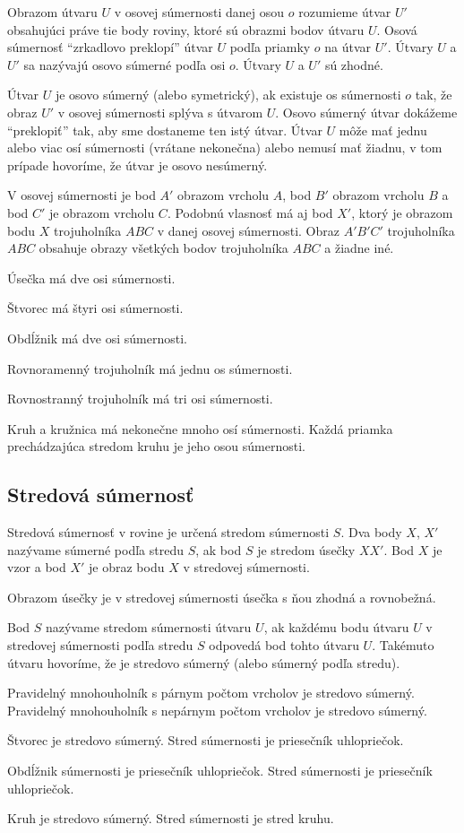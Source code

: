 \documentclass{article}
\begin{document}
Obrazom útvaru \(U\) v osovej súmernosti danej osou \(o\) rozumieme útvar \(U'\) obsahujúci práve tie body roviny, ktoré sú obrazmi bodov útvaru \(U\). Osová súmernosť \enquote{zrkadlovo preklopí} útvar \(U\) podľa priamky \(o\) na útvar \(U'\). Útvary \(U\) a \(U'\) sa nazývajú osovo súmerné podľa osi \(o\). Útvary \(U\) a \(U'\) sú zhodné.

Útvar \(U\) je osovo súmerný (alebo symetrický), ak existuje os súmernosti \(o\) tak, že obraz \(U'\) v osovej súmernosti splýva s útvarom \(U\). Osovo súmerný útvar dokážeme \enquote{preklopiť} tak, aby sme dostaneme ten istý útvar. Útvar \(U\) môže mať jednu alebo viac osí súmernosti (vrátane nekonečna) alebo nemusí mať žiadnu, v tom prípade hovoríme, že útvar je osovo nesúmerný.

V osovej súmernosti je bod \(A'\) obrazom vrcholu \(A\), bod \(B'\) obrazom vrcholu \(B\) a bod \(C'\) je obrazom vrcholu \(C\). Podobnú vlasnosť má aj bod \(X'\), ktorý je obrazom bodu \(X\) trojuholníka \(ABC\) v danej osovej súmernosti. Obraz \(A'B'C'\) trojuholníka \(ABC\) obsahuje obrazy všetkých bodov trojuholníka \(ABC\) a žiadne iné.

Úsečka má dve osi súmernosti.

Štvorec má štyri osi súmernosti.

Obdĺžnik má dve osi súmernosti.

Rovnoramenný trojuholník má jednu os súmernosti.

Rovnostranný trojuholník má tri osi súmernosti.

Kruh a kružnica má nekonečne mnoho osí súmernosti. Každá priamka prechádzajúca stredom kruhu je jeho osou súmernosti.

\subsection{Stredová súmernosť}

Stredová súmernosť v rovine je určená stredom súmernosti \(S\). Dva body \(X\), \(X'\) nazývame súmerné podľa stredu \(S\), ak bod \(S\) je stredom úsečky \(XX'\). Bod \(X\) je vzor a bod \(X'\) je obraz bodu \(X\) v stredovej súmernosti.

Obrazom úsečky je v stredovej súmernosti úsečka s ňou zhodná a rovnobežná.

Bod \(S\) nazývame stredom súmernosti útvaru \(U\), ak každému bodu útvaru \(U\) v stredovej súmernosti podľa stredu \(S\) odpovedá bod tohto útvaru \(U\). Takémuto útvaru hovoríme, že je stredovo súmerný (alebo súmerný podľa stredu).

Pravidelný mnohouholník s párnym počtom vrcholov je stredovo súmerný.
Pravidelný mnohouholník s nepárnym počtom vrcholov je stredovo súmerný.

Štvorec je stredovo súmerný. Stred súmernosti je priesečník uhlopriečok.

Obdĺžnik súmernosti je priesečník uhlopriečok. Stred súmernosti je priesečník uhlopriečok.

Kruh je stredovo súmerný. Stred súmernosti je stred kruhu.
\end{document}
